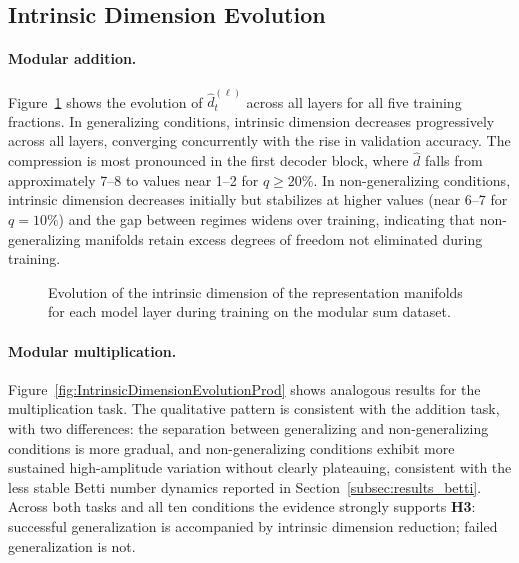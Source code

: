 \subsection{Intrinsic Dimension Evolution}
\label{subsec:results_id}

\paragraph{Modular addition.}
Figure~\ref{fig:IntrinsicDimensionEvolutionSum} shows the evolution of $\hat{d}^{(\ell)}_t$ across all layers for all five training fractions. In generalizing conditions, intrinsic dimension decreases progressively across all layers, converging concurrently with the rise in validation accuracy. The compression is most pronounced in the first decoder block, where $\hat{d}$ falls from approximately 7--8 to values near 1--2 for $q \geq 20\%$. In non-generalizing conditions, intrinsic dimension decreases initially but stabilizes at higher values  (near 6--7 for $q = 10\%$) and the gap between regimes widens over training, indicating that non-generalizing manifolds retain excess degrees of freedom not eliminated during training.

\begin{figure}[H]
    \centering
     
     
     
    \caption[Intrinsic dimension evolution (Modular Sum).]{Evolution of the intrinsic dimension of the representation manifolds for each model layer during training on the modular sum dataset.}
    \label{fig:IntrinsicDimensionEvolutionSum}
\end{figure}


\paragraph{Modular multiplication.}
Figure~\ref{fig:IntrinsicDimensionEvolutionProd} shows analogous results for the multiplication task. The qualitative pattern is consistent with the addition task, with two differences: the separation between generalizing and non-generalizing conditions is more gradual, and non-generalizing conditions exhibit more sustained high-amplitude variation without clearly plateauing, consistent with the less stable Betti number dynamics reported in Section~\ref{subsec:results_betti}. Across both tasks and all ten conditions the evidence strongly supports \textbf{H3}: successful generalization is accompanied by intrinsic dimension reduction; failed generalization is not. %

